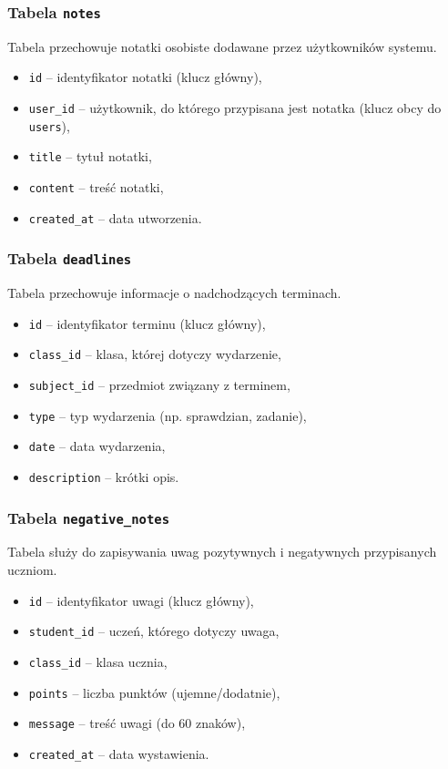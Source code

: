 \subsubsection*{Tabela \texttt{notes}}

Tabela przechowuje notatki osobiste dodawane przez użytkowników systemu.

\begin{itemize}
    \item \texttt{id} – identyfikator notatki (klucz główny),
    \item \texttt{user\_id} – użytkownik, do którego przypisana jest notatka (klucz obcy do \texttt{users}),
    \item \texttt{title} – tytuł notatki,
    \item \texttt{content} – treść notatki,
    \item \texttt{created\_at} – data utworzenia.
\end{itemize}

\subsubsection*{Tabela \texttt{deadlines}}

Tabela przechowuje informacje o nadchodzących terminach.

\begin{itemize}
    \item \texttt{id} – identyfikator terminu (klucz główny),
    \item \texttt{class\_id} – klasa, której dotyczy wydarzenie,
    \item \texttt{subject\_id} – przedmiot związany z terminem,
    \item \texttt{type} – typ wydarzenia (np. sprawdzian, zadanie),
    \item \texttt{date} – data wydarzenia,
    \item \texttt{description} – krótki opis.
\end{itemize}

\subsubsection*{Tabela \texttt{negative\_notes}}

Tabela służy do zapisywania uwag pozytywnych i negatywnych przypisanych uczniom.

\begin{itemize}
    \item \texttt{id} – identyfikator uwagi (klucz główny),
    \item \texttt{student\_id} – uczeń, którego dotyczy uwaga,
    \item \texttt{class\_id} – klasa ucznia,
    \item \texttt{points} – liczba punktów (ujemne/dodatnie),
    \item \texttt{message} – treść uwagi (do 60 znaków),
    \item \texttt{created\_at} – data wystawienia.
\end{itemize}

